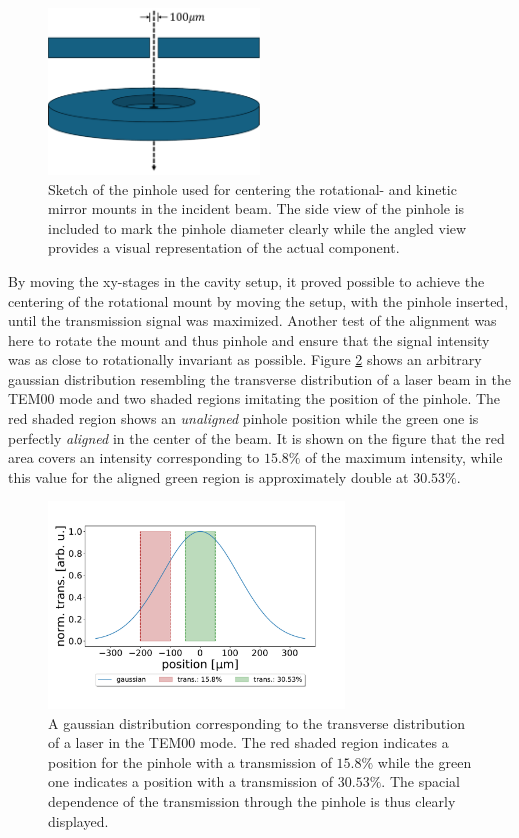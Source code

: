 \begin{figure}[h!]
    \centering
    \includegraphics[width=0.5\textwidth]{figures/pinhole_sketch.pdf}
    \caption{Sketch of the pinhole used for centering the rotational- and kinetic mirror mounts in the incident beam. The side view of the pinhole is included to mark the pinhole diameter clearly while the angled view provides a visual representation of the actual component.}
    \label{fig:pinhole_sketch}
\end{figure}

By moving the xy-stages in the cavity setup, it proved possible to achieve the centering of the rotational mount by moving the setup, with the pinhole inserted, until the transmission signal was maximized. Another test of the alignment was here to rotate the mount and thus pinhole and ensure that the signal intensity was as close to rotationally invariant as possible. Figure \ref{fig:pinhole_position_on_gaussian} shows an arbitrary gaussian distribution resembling the transverse distribution of a laser beam in the TEM00 mode and two shaded regions imitating the position of the pinhole. The red shaded region shows an \emph{unaligned} pinhole position while the green one is perfectly \emph{aligned} in the center of the beam. It is shown on the figure that the red area covers an intensity corresponding to $15.8\%$ of the maximum intensity, while this value for the aligned green region is approximately double at $30.53\%$.

\begin{figure}[h!]
    \centering
    \includegraphics[width=0.7\textwidth]{figures/pinhole_position_on_gaussian.pdf}
    \caption{A gaussian distribution corresponding to the transverse distribution of a laser in the TEM00 mode. The red shaded region indicates a position for the pinhole with a transmission of $15.8\%$ while the green one indicates a position with a transmission of $30.53\%$. The spacial dependence of the transmission through the pinhole is thus clearly displayed.}
    \label{fig:pinhole_position_on_gaussian}
\end{figure}

